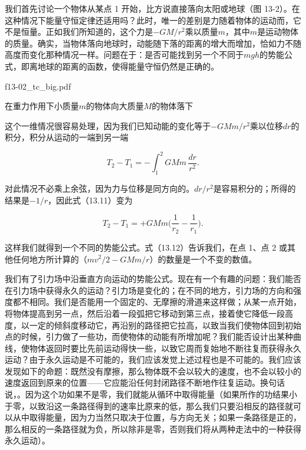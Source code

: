 \documentclass[12pt,oneside]{book}
\begin{document}
我们首先讨论一个物体从某点 1 开始，比方说直接落向太阳或地球（图 13-2）。在这种情况下能量守恒定律还适用吗？此时，唯一的差别是力随着物体的运动而，它不是恒量。正如我们所知道的，这个力是$-GM/r^2$乘以质量$m$，其中$m$是运动物体的质量。确实，当物体落向地球时，动能随下落的距离的增大而增加，恰如力不随高度而变化那种情况一样。问题在于：是否可能找到另一个不同于$mgh$的势能公式，即离地球的距离的函数，使得能量守恒仍然是正确的。

\begin{fig}{f13-02_tc_big.pdf}
\caption{在重力作用下小质量$m$的物体向大质量$M$的物体落下}
\label{fig:13-2}
\end{fig}


这个一维情况很容易处理，因为我们已知动能的变化等于$-GMm/r^2$乘以位移$dr$的积分，积分从运动的一端到另一端

\begin{equation}
\label{Eq:I:13:11}
T_2-T_1=-\int_1^2GMm\,\frac{dr}{r^2}.
\end{equation}

对此情况不必乘上余弦，因为力与位移是同方向的。$dr/r^2$是容易积分的；所得的结果是$-1/r$，因此式（13.11）变为


\begin{equation}
\label{Eq:I:13:12}
T_2-T_1=+GMm\biggr(\frac{1}{r_2}-\frac{1}{r_1}\biggr).
\end{equation}

这样我们就得到一个不同的势能公式。式（13.12）告诉我们，在点 1、点 2 或其他任何地方所计算的（$mv^2/2 - GMm/r$）的数量是一个不变的数值。


我们有了引力场中沿垂直方向运动的势能公式。现在有一个有趣的问题：我们能否在引力场中获得永久的运动？引力场是变化的；在不同的地方，引力场的方向和强度都不相同。我们是否能用一个固定的、无摩擦的滑道来这样做；从某一点开始，将物体提高到另一点，然后沿着一段弧把它移动到第三点，接着使它降低一段高度，以一定的倾斜度移动它，再沿别的路径把它拉高，以致当我们使物体回到初始点的时候，引力做了一些功，而使物体的动能有所增加呢？我们能否设计出某种曲线，使物体返回时要比先前运动得快一些，以致它周而复始地不断往复而获得永久运动？由于永久运动是不可能的，我们应该发觉上述过程也是不可能的。我们应该发现如下的命题：既然没有摩擦，那么物体既不会以较大的速度，也不会以较小的速度返回到原来的位置——它应能沿任何封闭路径不断地作往复运动。换句话说，。因为这个功如果不是零，我们就能从循环中取得能量（如果所作的功结果小于零，以致沿这一条路径得到的速率比原来的低，那么我们只要沿相反的路径就可以从中取得能量，因为力当然只取决于位置，与方向无关；如果一条路径是正的，那么相反的一条路径就为负，所以除非是零，否则我们将从两种走法中的一种获得永久运动）。
\end{document}
